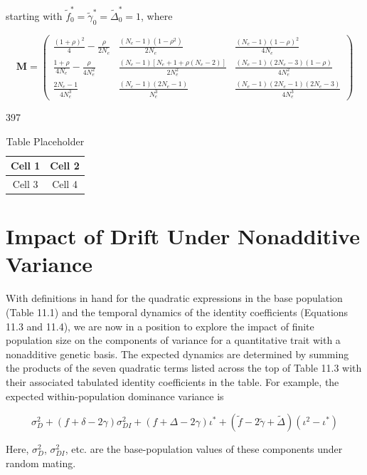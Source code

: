 \documentclass{article}
\begin{document}
starting with  $ \widetilde{f}_{0}^{*}=\widetilde{\gamma}_{0}^{*}=\widetilde{\Delta}_{0}^{*}=1 $, where

\begin{equation}
\mathbf{M}=\begin{pmatrix}\frac{(1+\rho)^{2}}{4}-\frac{\rho}{2N_{e}}&\frac{(N_{e}-1)(1-\rho^{2})}{2N_{e}}&\frac{(N_{e}-1)(1-\rho)^{2}}{4N_{e}}\\\frac{1+\rho}{4N_{e}}-\frac{\rho}{4N_{e}^{2}}&\frac{(N_{e}-1)[N_{e}+1+\rho(N_{e}-2)]}{2N_{e}^{2}}&\frac{(N_{e}-1)(2N_{e}-3)(1-\rho)}{4N_{e}^{2}}\\\frac{2N_{e}-1}{4N_{e}^{3}}&\frac{(N_{e}-1)(2N_{e}-1)}{N_{e}^{3}}&\frac{(N_{e}-1)(2N_{e}-1)(2N_{e}-3)}{4N_{e}^{3}}\end{pmatrix}
\tag{11.4b}
\label{eq:11_4b}
\end{equation}

397

\begin{table}[h]
\centering
\begin{tabular}{|c|c|}
\hline
Cell 1 & Cell 2 \\
\hline
Cell 3 & Cell 4 \\
\hline
\end{tabular}
\caption{Table Placeholder}
\end{table}

\section{Impact of Drift Under Nonadditive Variance}
With definitions in hand for the quadratic expressions in the base population (Table 11.1) and the temporal dynamics of the identity coefficients (Equations 11.3 and 11.4), we are now in a position to explore the impact of finite population size on the components of variance for a quantitative trait with a nonadditive genetic basis. The expected dynamics are determined by summing the products of the seven quadratic terms listed across the top of Table 11.3 with their associated tabulated identity coefficients in the table. For example, the expected within-population dominance variance is

\begin{equation}
[1-3f+2(\Delta+\gamma-\delta)]\sigma_{D}^{2}+(f+\delta-2\gamma)\sigma_{D I}^{2}+(f+\Delta-2\gamma)\iota^{*}+(\widetilde{f}-2\widetilde{\gamma}+\widetilde{\Delta})(\iota^{2}-\iota^{*})
\end{equation}

Here,  $ \sigma_{D}^{2} $,  $ \sigma_{DI}^{2} $, etc. are the base-population values of these components under random mating.
\end{document}
